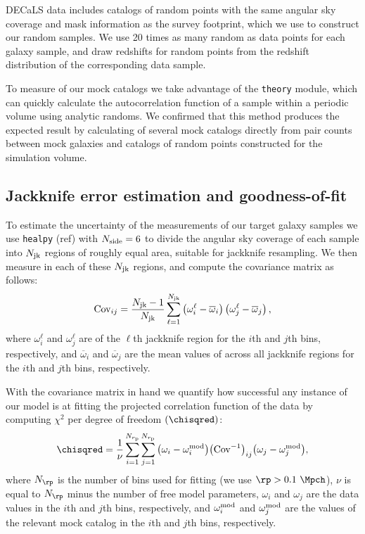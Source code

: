\documentclass[twocolumn,apj,iop,tighten]{emulateapj2}
\begin{document}
DECaLS data includes catalogs of random points with the same angular sky coverage and mask information as the survey footprint, which we use to construct our random samples. We use 20 times as many random as data points for each galaxy sample, and draw redshifts for random points from the redshift distribution of the corresponding data sample.

To measure \wprp of our mock catalogs we take advantage of the \corrfunc \texttt{theory} module, which can quickly calculate the autocorrelation function of a sample within a periodic volume using analytic randoms. We confirmed that this method produces the expected result by calculating \wprp of several mock catalogs directly from pair counts between mock galaxies and catalogs of random points constructed for the simulation volume.


\subsection{Jackknife error estimation and goodness-of-fit}\label{subsec:error}

To estimate the uncertainty of the \wprp measurements of our target galaxy samples we use \texttt{healpy} (ref) with $N_{\rm side}=6$ to divide the angular sky coverage of each sample into $N_{\rm jk}$ regions of roughly equal area, suitable for jackknife resampling. We then measure \wprp in each of these $N_{\rm jk}$ regions, and compute the covariance matrix as follows:
\begin{equation}\label{eq:cov}
{\rm Cov}_{ij} = \frac{N_{\rm jk}-1}{N_{\rm jk}}
\sum^{N_{\rm jk}}_{\ell=1}\left(\omega^\ell_i-\overline{\omega}_i\right) \left(\omega^\ell_j-\overline{\omega}_j\right),
\end{equation}
%
\noindent where $\omega^\ell_i$ and $\omega^\ell_j$ are \wprp of the $\ell$th jackknife region for the $i$th and $j$th \rp bins, respectively, and $\overline{\omega}_i$ and $\overline{\omega}_j$ are the mean values of \wprp across all jackknife regions for the $i$th and $j$th \rp bins, respectively.

With the covariance matrix in hand we quantify how successful any instance of our model is at fitting the projected correlation function of the data by computing $\chi^2$ per degree of freedom $(\chisqred)$:
%
\begin{equation}\label{eq:chisq}
\chisqred=\frac{1}{\nu}\sum_{i=1}^{N_{r_{\rm p}}}
\sum_{j=1}^{N_{r_{\rm p}}}\left(\omega_i-\omega^{\rm mod}_i\right)
\!\left({\rm Cov}^{-1}\right)_{ij}\!\left(\omega_j-\omega^{\rm mod}_j\right)\!,
\end{equation}
%
\noindent where $N_{\rp}$ is the number of \rp bins used for fitting (we use $\rp>0.1~\Mpch$), $\nu$ is equal to $N_{\rp}$ minus the number of free model parameters, $\omega_i$ and $\omega_j$ are the data \wprp values in the $i$th and $j$th \rp bins, respectively, and $\omega^{\rm mod}_i$ and $\omega^{\rm mod}_j$ are the \wprp values of the relevant mock catalog in the $i$th and $j$th \rp bins, respectively.
\end{document}
